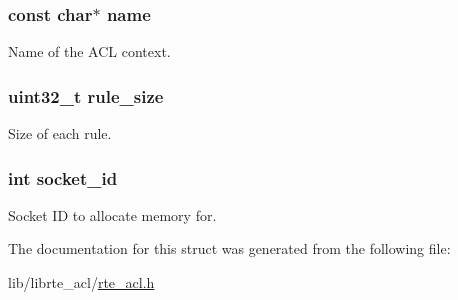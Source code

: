 \subsubsection[{name}]{\setlength{\rightskip}{0pt plus 5cm}const char$\ast$ name}\label{structrte__acl__param_a8f8f80d37794cde9472343e4487ba3eb}
Name of the A\+C\+L context. \hypertarget{structrte__acl__param_a9d9bf36dd2be0faabab8927ef50ce2f7}{}
\subsubsection[{rule\+\_\+size}]{\setlength{\rightskip}{0pt plus 5cm}uint32\+\_\+t rule\+\_\+size}\label{structrte__acl__param_a9d9bf36dd2be0faabab8927ef50ce2f7}
Size of each rule. \hypertarget{structrte__acl__param_a229cb0bd24215f0cb940e0724dbd4d55}{}
\subsubsection[{socket\+\_\+id}]{\setlength{\rightskip}{0pt plus 5cm}int socket\+\_\+id}\label{structrte__acl__param_a229cb0bd24215f0cb940e0724dbd4d55}
Socket I\+D to allocate memory for. 

The documentation for this struct was generated from the following file\+:\begin{DoxyCompactItemize}
\item 
lib/librte\+\_\+acl/\hyperlink{rte__acl_8h}{rte\+\_\+acl.\+h}\end{DoxyCompactItemize}
